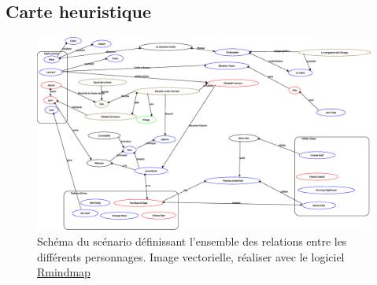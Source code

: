 \documentclass[oneside,12pt]{book}
\begin{document}
\begin{flushleft}
\section{Carte heuristique}  
\begin{figure}[!ht]
\includegraphics[width=\textwidth]{canada_2.eps}
\caption{Schéma du scénario définissant l'ensemble des relations entre les différents personnages. Image vectorielle, réaliser avec le logiciel \href{https://github.com/obiwankennedy/rmindmap}{Rmindmap}}
\label{fig:mindmap}
\end{figure}

\end{flushleft}
\end{document}
